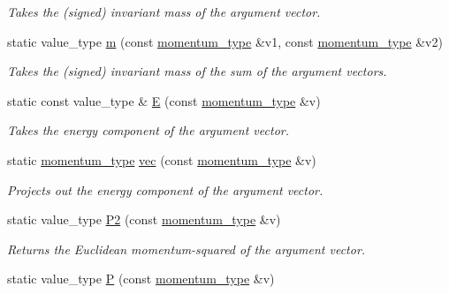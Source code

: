 \begin{DoxyCompactItemize}
\begin{DoxyCompactList}\small\item\em Takes the (signed) invariant mass of the argument vector. \end{DoxyCompactList}\item 
\hypertarget{a00442_aa69c214d8a0919135c0726cc70f78556}{static value\-\_\-type \hyperlink{a00442_aa69c214d8a0919135c0726cc70f78556}{m} (const \hyperlink{a00559}{momentum\-\_\-type} \&v1, const \hyperlink{a00559}{momentum\-\_\-type} \&v2)}\label{a00442_aa69c214d8a0919135c0726cc70f78556}

\begin{DoxyCompactList}\small\item\em Takes the (signed) invariant mass of the sum of the argument vectors. \end{DoxyCompactList}\item 
\hypertarget{a00442_a8a2e0cd9b961dcfa2eb1ac7426cf3f5f}{static const value\-\_\-type \& \hyperlink{a00442_a8a2e0cd9b961dcfa2eb1ac7426cf3f5f}{E} (const \hyperlink{a00559}{momentum\-\_\-type} \&v)}\label{a00442_a8a2e0cd9b961dcfa2eb1ac7426cf3f5f}

\begin{DoxyCompactList}\small\item\em Takes the energy component of the argument vector. \end{DoxyCompactList}\item 
\hypertarget{a00442_abcd8c1b1d66ee3e9d7203115a3f2be73}{static \hyperlink{a00559}{momentum\-\_\-type} \hyperlink{a00442_abcd8c1b1d66ee3e9d7203115a3f2be73}{vec} (const \hyperlink{a00559}{momentum\-\_\-type} \&v)}\label{a00442_abcd8c1b1d66ee3e9d7203115a3f2be73}

\begin{DoxyCompactList}\small\item\em Projects out the energy component of the argument vector. \end{DoxyCompactList}\item 
\hypertarget{a00442_a75e11d7eafdcb47b1d0030ef834d1bf2}{static value\-\_\-type \hyperlink{a00442_a75e11d7eafdcb47b1d0030ef834d1bf2}{P2} (const \hyperlink{a00559}{momentum\-\_\-type} \&v)}\label{a00442_a75e11d7eafdcb47b1d0030ef834d1bf2}

\begin{DoxyCompactList}\small\item\em Returns the Euclidean momentum-\/squared of the argument vector. \end{DoxyCompactList}\item 
\hypertarget{a00442_a3de3823ace2a7d741b8526cc6b2fb56d}{static value\-\_\-type \hyperlink{a00442_a3de3823ace2a7d741b8526cc6b2fb56d}{P} (const \hyperlink{a00559}{momentum\-\_\-type} \&v)}\label{a00442_a3de3823ace2a7d741b8526cc6b2fb56d}


\end{DoxyCompactItemize}
